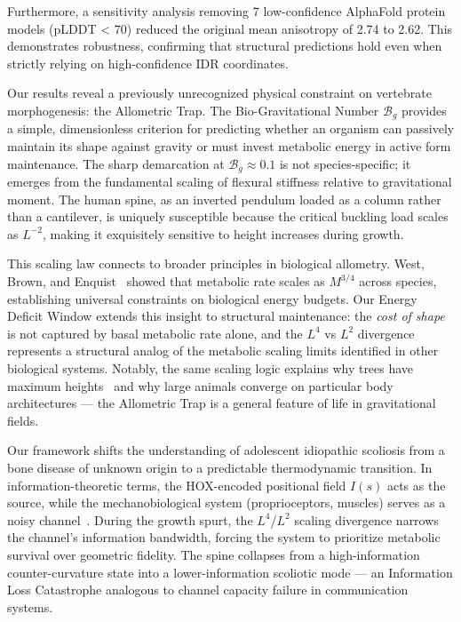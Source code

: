 \documentclass[11pt]{article}
\begin{document}
Furthermore, a sensitivity analysis removing 7 low-confidence AlphaFold protein models (pLDDT < 70) reduced the original mean anisotropy of 2.74 to 2.62. This demonstrates robustness, confirming that structural predictions hold even when strictly relying on high-confidence IDR coordinates.

Our results reveal a previously unrecognized physical constraint on vertebrate morphogenesis: the Allometric Trap. The Bio-Gravitational Number $\mathcal{B}_g$ provides a simple, dimensionless criterion for predicting whether an organism can passively maintain its shape against gravity or must invest metabolic energy in active form maintenance. The sharp demarcation at $\mathcal{B}_g \approx 0.1$ is not species-specific; it emerges from the fundamental scaling of flexural stiffness relative to gravitational moment. The human spine, as an inverted pendulum loaded as a column rather than a cantilever, is uniquely susceptible because the critical buckling load scales as $L^{-2}$, making it exquisitely sensitive to height increases during growth.

This scaling law connects to broader principles in biological allometry. West, Brown, and Enquist~\cite{west1997general} showed that metabolic rate scales as $M^{3/4}$ across species, establishing universal constraints on biological energy budgets. Our Energy Deficit Window extends this insight to structural maintenance: the \emph{cost of shape} is not captured by basal metabolic rate alone, and the $L^4$ vs $L^2$ divergence represents a structural analog of the metabolic scaling limits identified in other biological systems. Notably, the same scaling logic explains why trees have maximum heights~\cite{niklas1994plant} and why large animals converge on particular body architectures --- the Allometric Trap is a general feature of life in gravitational fields.

Our framework shifts the understanding of adolescent idiopathic scoliosis from a bone disease of unknown origin to a predictable thermodynamic transition. In information-theoretic terms, the HOX-encoded positional field $I(s)$ acts as the source, while the mechanobiological system (proprioceptors, muscles) serves as a noisy channel~\cite{cover2006elements}. During the growth spurt, the $L^4$/$L^2$ scaling divergence narrows the channel's information bandwidth, forcing the system to prioritize metabolic survival over geometric fidelity. The spine collapses from a high-information counter-curvature state into a lower-information scoliotic mode --- an Information Loss Catastrophe analogous to channel capacity failure in communication systems.
\end{document}
